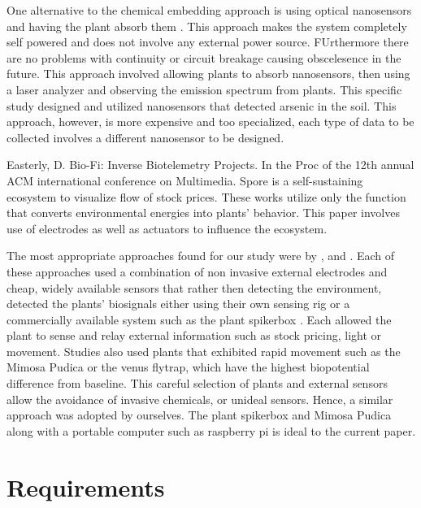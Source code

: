 \documentclass[conference]{IEEEtran}
\begin{document}
One alternative to the chemical embedding approach is using optical nanosensors
and having the plant absorb them \cite{lew2020}. This approach makes the 
system completely self powered and does not involve any external power source.
FUrthermore there are no problems with continuity or circuit breakage causing
obscelesence in the future. This approach involved allowing plants to absorb 
nanosensors, then using a laser analyzer and observing the emission spectrum from
plants. This specific study designed and utilized nanosensors that detected arsenic
in the soil. This approach, however, is more expensive and too specialized, each
type of data to be collected involves a different nanosensor to be designed.


Easterly, D. Bio-Fi: Inverse Biotelemetry Projects. In the Proc of the 
12th annual ACM international conference on Multimedia. Spore is a 
self-sustaining ecosystem to visualize flow of stock prices. These works
utilize only the function that converts environmental energies into 
plants’ behavior. This paper involves use of electrodes as well as
actuators to influence the ecosystem. 

The most appropriate approaches found for our study were by \cite{easterly2004},
\cite{kuribayashi2007} and \cite{oezkaya2020}. Each of these approaches used
a combination of non invasive external electrodes and cheap, widely available 
sensors that rather then detecting the environment, detected the plants' biosignals
either using their own sensing rig or a commercially available system such as the plant
spikerbox \cite{zotero-53}. Each allowed the plant to sense and relay external information
such as stock pricing, light or movement. Studies also used plants that exhibited
rapid movement such as the Mimosa Pudica or the venus flytrap, which have the highest
biopotential difference from baseline. This careful selection of plants and external sensors
allow the avoidance of invasive chemicals, or unideal sensors. Hence, a similar approach was
adopted by ourselves. The plant spikerbox and Mimosa Pudica along with a portable computer
such as raspberry pi is ideal to the current paper.



\section{Requirements}
\end{document}
